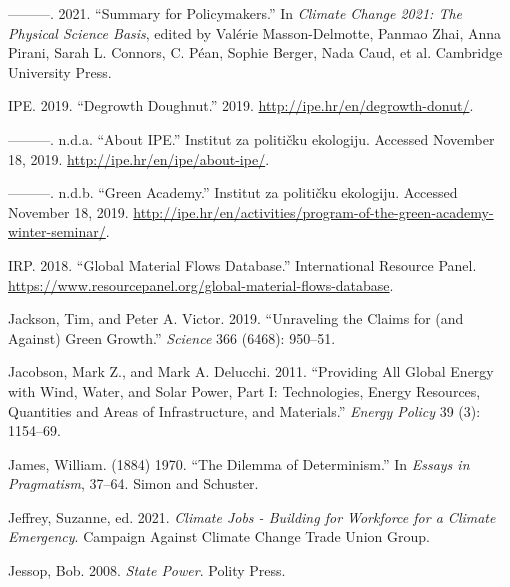 \documentclass[a4paper, nobind]{templates/ociamthesis}
\newlength{\cslhangindent}
\newenvironment{CSLReferences}[2] %
 {%
  \setlength{\parindent}{0pt}
  \ifodd #1
  \let\oldpar\par
  \def\par{\hangindent=\cslhangindent\oldpar}
  \fi
  \setlength{\parskip}{1mm}
  \setlength{\baselineskip}{6mm}
 }%
 {}
\begin{document}
\begin{CSLReferences}{1}{0}
\leavevmode{}%
---------. 2021. {``Summary for Policymakers.''} In \emph{Climate {Change} 2021: {The Physical Science Basis}}, edited by Valérie Masson-Delmotte, Panmao Zhai, Anna Pirani, Sarah L. Connors, C. Péan, Sophie Berger, Nada Caud, et al. {Cambridge University Press}.

\leavevmode{}%
IPE. 2019. {``Degrowth {Doughnut}.''} 2019. \url{http://ipe.hr/en/degrowth-donut/}.

\leavevmode{}%
---------. n.d.a. {``About {IPE}.''} {Institut za političku ekologiju}. Accessed November 18, 2019. \url{http://ipe.hr/en/ipe/about-ipe/}.

\leavevmode{}%
---------. n.d.b. {``Green {Academy}.''} {Institut za političku ekologiju}. Accessed November 18, 2019. \url{http://ipe.hr/en/activities/program-of-the-green-academy-winter-seminar/}.

\leavevmode{}%
IRP. 2018. {``Global {Material Flows Database}.''} {International Resource Panel}. \url{https://www.resourcepanel.org/global-material-flows-database}.

\leavevmode{}%
Jackson, Tim, and Peter A. Victor. 2019. {``Unraveling the Claims for (and Against) Green Growth.''} \emph{Science} 366 (6468): 950--51.

\leavevmode{}%
Jacobson, Mark Z., and Mark A. Delucchi. 2011. {``Providing All Global Energy with Wind, Water, and Solar Power, {Part I}: {Technologies}, Energy Resources, Quantities and Areas of Infrastructure, and Materials.''} \emph{Energy Policy} 39 (3): 1154--69.

\leavevmode{}%
James, William. (1884) 1970. {``The {Dilemma} of {Determinism}.''} In \emph{Essays in {Pragmatism}}, 37--64. {Simon and Schuster}.

\leavevmode{}%
Jeffrey, Suzanne, ed. 2021. \emph{Climate {Jobs} - {Building} for {Workforce} for a {Climate Emergency}}. {Campaign Against Climate Change Trade Union Group}.

\leavevmode{}%
Jessop, Bob. 2008. \emph{State {Power}}. {Polity Press}.


\end{CSLReferences}
\end{document}
